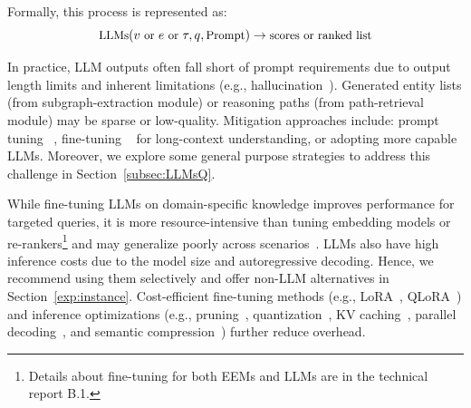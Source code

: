 {
Formally, this process is represented as:
\begin{equation*}
\small
\label{eq:LLMs_score}
\text{LLMs}(v \text{ or } e \text{ or } \tau, q, \text{Prompt}) \rightarrow \text{scores} \text{ or } \text{ranked list}  
\end{equation*}    

In practice, LLM outputs often fall short of prompt requirements due to output length limits and inherent limitations (e.g., hallucination~\cite{ref:hallucination}). Generated entity lists (from subgraph-extraction module) or reasoning paths (from path-retrieval module) may be sparse or low-quality. Mitigation approaches include: prompt tuning ~\cite{lift}, fine-tuning ~\cite{longlora} for long-context understanding, or adopting more capable LLMs.  Moreover, we explore some general purpose strategies to address this challenge in Section~\ref{subsec:LLMsQ}.

While fine-tuning LLMs on domain-specific knowledge improves performance for targeted queries, it is more resource-intensive than tuning embedding models or re-rankers\footnote{Details about fine-tuning for both EEMs and LLMs are in the technical report B.1.} and may generalize poorly across scenarios~\cite{SubgraphRAG}. LLMs also have high inference costs due to the model size and autoregressive decoding. 
Hence, we recommend using them selectively and offer non-LLM alternatives in Section~\ref{exp:instance}. Cost-efficient fine-tuning methods (e.g., LoRA~\cite{lora}, QLoRA~\cite{qlora}) and inference optimizations (e.g., pruning~\cite{evop}, quantization~\cite{sustainable}, KV caching~\cite{KVLLM}, parallel decoding~\cite{hardware}, and semantic compression~\cite{chunkkv}) further reduce overhead. 


}
